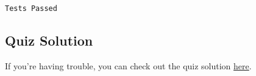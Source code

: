 \documentclass[11pt]{article}
\begin{document}
    \begin{Verbatim}[commandchars=\\\{\}]
Tests Passed

    \end{Verbatim}

    \subsection{Quiz Solution}\label{quiz-solution}

If you're having trouble, you can check out the quiz solution
\href{dtype_solution.ipynb}{here}.


    
    
    
    
\end{document}
